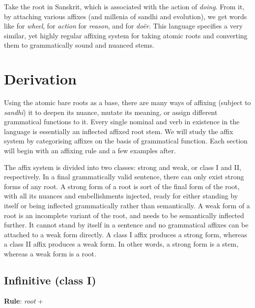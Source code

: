 \documentclass[14pt,oneside]{book}
\let\b\undefined
\newcommand{\b}[1]{{\brahmifont #1}}
\begin{document}
Take the root \b{𑀓𑀾} in Sanskrit, which is associated with the action of \textit{doing}. From it, by attaching various affixes (and millenia of sandhi and evolution), we get words like \b{𑀘𑀓𑁆𑀭} for \textit{wheel}, \b{𑀓𑀭𑁆𑀫} for \textit{action} \b{𑀓𑀸𑀭𑀡𑀁} for \textit{reason}, and \b{𑀓𑀭𑁆𑀢} for \textit{doër}. This language specifies a very similar, yet highly regular affixing system for taking atomic roots and converting them to grammatically sound and nuanced stems.








\section{Derivation}

Using the atomic bare roots as a base, there are many ways of affixing (subject to \textit{sandhi}) it to deepen its nuance, mutate its meaning, or assign different grammatical functions to it. Every single nominal and verb in existence in the language is essentially an inflected affixed root stem. We will study the affix system by categorising affixes on the basis of grammatical function. Each section will begin with an affixing rule and a few examples after.


The affix system is divided into two classes: strong and weak, or class I and II, respectively. In a final grammatically valid sentence, there can only exist strong forms of any root. A strong form of a root is sort of the final form of the root, with all its nuances and embellishments injected, ready for either standing by itself or being inflected grammatically rather than semantically. A weak form of a root is an incomplete variant of the root, and needs to be semantically inflected further. It cannot stand by itself in a sentence and no grammatical affixes can be attached to a weak form directly. A class I affix produces a strong form, whereas a class II affix produces a weak form. In other words, a strong form is a stem, whereas a weak form is a root.


\subsection{Infinitive (class I)}

\textbf{Rule}: \textit{root} + \b{𑀅𑀲}
\end{document}
